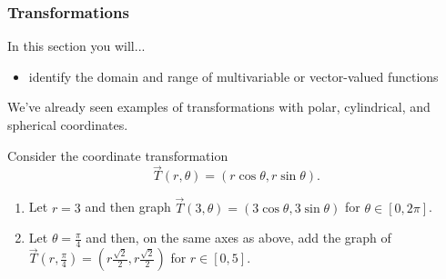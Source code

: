 \subsubsection{Transformations}
In this section you will...
\begin{itemize}
\item identify the domain and range of multivariable or vector-valued functions
\end{itemize}

 We've already seen examples of transformations with polar, cylindrical, and spherical coordinates.

\begin{review*}
Consider the coordinate transformation $$\vec T(r,\theta) = (r\cos\theta,r\sin\theta).$$ 
\begin{enumerate}
\item Let $r=3$ and then graph $\vec T(3,\theta)=(3\cos\theta,3\sin\theta)$ for $\theta\in[0,2\pi]$.
\item Let $\theta=\frac{\pi}{4}$ and then, on the same axes as above, add the graph of 
$\vec T\left(r,\frac{\pi}{4}\right)=\left(r\frac{\sqrt 2}{2},r \frac{\sqrt 2}{2}\right)$ for $r\in[0,5]$.
\end{enumerate}
\end{review*}

